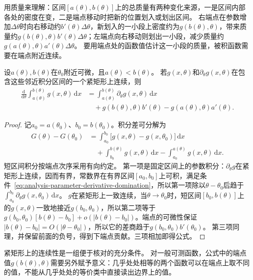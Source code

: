 用质量来理解：区间$[a(\theta),b(\theta)]$上的总质量有两种变化来源，一是区间内部各处的密度在变，二是端点移动时把新的位置划入或划出区间。
右端点在参数增加$\Delta\theta$时向右移动约$b'(\theta)\Delta\theta$，新划入的一小段上密度约为$g(b(\theta),\theta)$，带来质量约$g(b(\theta),\theta)b'(\theta)\Delta\theta$；左端点向右移动则划出一小段，减少质量约$g(a(\theta),\theta)a'(\theta)\Delta\theta$。
要用端点处的函数值估计这一小段的质量，被积函数需要在端点附近连续。
\begin{theorem}[变限参数积分的求导]
设$a(\theta),b(\theta)$在$\theta_0$附近可微，且$a(\theta)<b(\theta)$。
若$g(x,\theta)$和$\partial_\theta g(x,\theta)$在包含这些邻近积分区间的一个紧矩形上连续，则
\begin{equation}
 \begin{aligned}
 \frac{\mathrm d}{\mathrm d\theta}\int_{a(\theta)}^{b(\theta)}g(x,\theta)\,\mathrm dx
 &=\int_{a(\theta)}^{b(\theta)}\partial_\theta g(x,\theta)\,\mathrm dx\\
 &\quad+g(b(\theta),\theta)b'(\theta)
 -g(a(\theta),\theta)a'(\theta).
 \end{aligned}
\label{eq:measurable-moving-boundary-integral}
\end{equation}
\end{theorem}
\begin{proof}
记$a_0=a(\theta_0)$、$b_0=b(\theta_0)$。积分差可分解为
\[
 \begin{aligned}
 G(\theta)-G(\theta_0)
 &=\int_{a_0}^{b_0}\bigl[g(x,\theta)-g(x,\theta_0)\bigr]\,\mathrm dx\\
 &\quad+\int_{b_0}^{b(\theta)}g(x,\theta)\,\mathrm dx
 -\int_{a_0}^{a(\theta)}g(x,\theta)\,\mathrm dx.
 \end{aligned}
\]
短区间积分按端点次序采用有向约定。
第一项是固定区间上的参数积分：$\partial_\theta g$在紧矩形上连续，因而有界，常数界在有界区间$[a_0,b_0]$上可积，满足条件~\eqref{eq:analysis-parameter-derivative-domination}，所以第一项除以$\theta-\theta_0$后趋于$\int_{a_0}^{b_0}\partial_\theta g(x,\theta_0)\,\mathrm dx$。
$g$在紧矩形上一致连续，当$\theta\to\theta_0$时，短区间$[b_0,b(\theta)]$上的$g(x,\theta)$一致地接近$g(b_0,\theta_0)$，所以第二项等于
$g(b_0,\theta_0)[b(\theta)-b_0]+o(|b(\theta)-b_0|)$。端点的可微性保证$|b(\theta)-b_0|=O(|\theta-\theta_0|)$，所以它的差商趋于$g(b_0,\theta_0)b'(\theta_0)$。
第三项同理，并保留前面的负号，得到下端点贡献。三项相加即得公式。
\end{proof}

紧矩形上的连续性是一组便于核对的充分条件。
对一般可测函数，公式中的端点值$g(b(\theta),\theta)$需要另外赋予意义：几乎处处相等的两个函数可以在端点上取不同的值，不能从几乎处处的等价类中直接读出边界上的值。

\FloatBarrier
